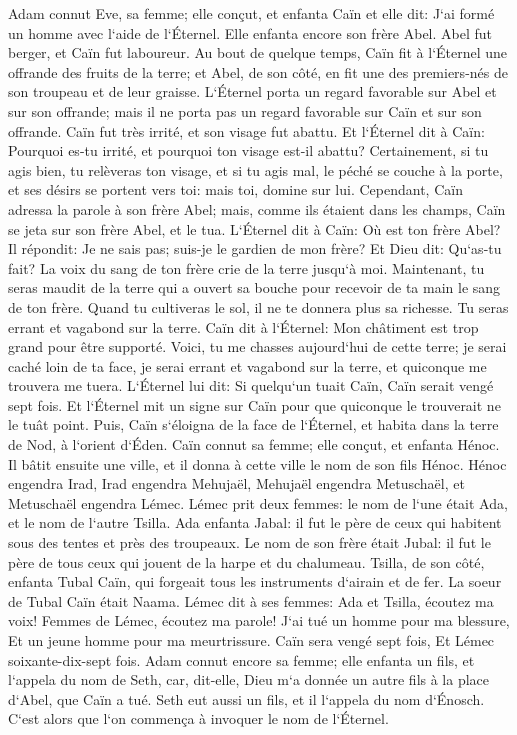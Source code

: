 \verse Adam connut Eve, sa femme; elle conçut, et enfanta Caïn et elle dit: J`ai formé un homme avec l`aide de l`Éternel. 
\verse Elle enfanta encore son frère Abel. Abel fut berger, et Caïn fut laboureur. 
\verse Au bout de quelque temps, Caïn fit à l`Éternel une offrande des fruits de la terre; 
\verse et Abel, de son côté, en fit une des premiers-nés de son troupeau et de leur graisse. L`Éternel porta un regard favorable sur Abel et sur son offrande; 
\verse mais il ne porta pas un regard favorable sur Caïn et sur son offrande. Caïn fut très irrité, et son visage fut abattu. 
\verse Et l`Éternel dit à Caïn: Pourquoi es-tu irrité, et pourquoi ton visage est-il abattu? 
\verse Certainement, si tu agis bien, tu relèveras ton visage, et si tu agis mal, le péché se couche à la porte, et ses désirs se portent vers toi: mais toi, domine sur lui. 
\verse Cependant, Caïn adressa la parole à son frère Abel; mais, comme ils étaient dans les champs, Caïn se jeta sur son frère Abel, et le tua. 
\verse L`Éternel dit à Caïn: Où est ton frère Abel? Il répondit: Je ne sais pas; suis-je le gardien de mon frère? 
\verse Et Dieu dit: Qu`as-tu fait? La voix du sang de ton frère crie de la terre jusqu`à moi. 
\verse Maintenant, tu seras maudit de la terre qui a ouvert sa bouche pour recevoir de ta main le sang de ton frère. 
\verse Quand tu cultiveras le sol, il ne te donnera plus sa richesse. Tu seras errant et vagabond sur la terre. 
\verse Caïn dit à l`Éternel: Mon châtiment est trop grand pour être supporté. 
\verse Voici, tu me chasses aujourd`hui de cette terre; je serai caché loin de ta face, je serai errant et vagabond sur la terre, et quiconque me trouvera me tuera. 
\verse L`Éternel lui dit: Si quelqu`un tuait Caïn, Caïn serait vengé sept fois. Et l`Éternel mit un signe sur Caïn pour que quiconque le trouverait ne le tuât point. 
\verse Puis, Caïn s`éloigna de la face de l`Éternel, et habita dans la terre de Nod, à l`orient d`Éden. 
\verse Caïn connut sa femme; elle conçut, et enfanta Hénoc. Il bâtit ensuite une ville, et il donna à cette ville le nom de son fils Hénoc. 
\verse Hénoc engendra Irad, Irad engendra Mehujaël, Mehujaël engendra Metuschaël, et Metuschaël engendra Lémec. 
\verse Lémec prit deux femmes: le nom de l`une était Ada, et le nom de l`autre Tsilla. 
\verse Ada enfanta Jabal: il fut le père de ceux qui habitent sous des tentes et près des troupeaux. 
\verse Le nom de son frère était Jubal: il fut le père de tous ceux qui jouent de la harpe et du chalumeau. 
\verse Tsilla, de son côté, enfanta Tubal Caïn, qui forgeait tous les instruments d`airain et de fer. La soeur de Tubal Caïn était Naama. 
\verse Lémec dit à ses femmes: Ada et Tsilla, écoutez ma voix! Femmes de Lémec, écoutez ma parole! J`ai tué un homme pour ma blessure, Et un jeune homme pour ma meurtrissure. 
\verse Caïn sera vengé sept fois, Et Lémec soixante-dix-sept fois. 
\verse Adam connut encore sa femme; elle enfanta un fils, et l`appela du nom de Seth, car, dit-elle, Dieu m`a donnée un autre fils à la place d`Abel, que Caïn a tué. 
\verse Seth eut aussi un fils, et il l`appela du nom d`Énosch. C`est alors que l`on commença à invoquer le nom de l`Éternel. 

